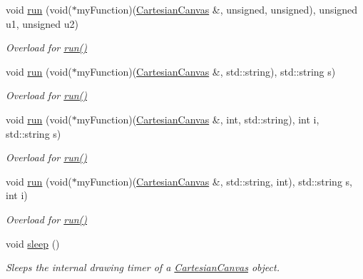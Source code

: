\begin{DoxyCompactItemize}
void \hyperlink{classtsgl_1_1_cartesian_canvas_a3351ccc624bb154dc910cafd9effe3cd}{run} (void($\ast$my\-Function)(\hyperlink{classtsgl_1_1_cartesian_canvas}{\-Cartesian\-Canvas} \&, unsigned, unsigned), unsigned u1, unsigned u2)
\begin{DoxyCompactList}\small\item\em \-Overload for \hyperlink{classtsgl_1_1_cartesian_canvas_a63a948af53582b713957b872a765dcdb}{run()} \end{DoxyCompactList}\item 
void \hyperlink{classtsgl_1_1_cartesian_canvas_a7d76ab9f68d8ce7f76b6be20305a5e95}{run} (void($\ast$my\-Function)(\hyperlink{classtsgl_1_1_cartesian_canvas}{\-Cartesian\-Canvas} \&, std\-::string), std\-::string s)
\begin{DoxyCompactList}\small\item\em \-Overload for \hyperlink{classtsgl_1_1_cartesian_canvas_a63a948af53582b713957b872a765dcdb}{run()} \end{DoxyCompactList}\item 
void \hyperlink{classtsgl_1_1_cartesian_canvas_ab0bce76883df5ae48e368a7b7835aefd}{run} (void($\ast$my\-Function)(\hyperlink{classtsgl_1_1_cartesian_canvas}{\-Cartesian\-Canvas} \&, int, std\-::string), int i, std\-::string s)
\begin{DoxyCompactList}\small\item\em \-Overload for \hyperlink{classtsgl_1_1_cartesian_canvas_a63a948af53582b713957b872a765dcdb}{run()} \end{DoxyCompactList}\item 
void \hyperlink{classtsgl_1_1_cartesian_canvas_abf52fc46a6fdca1410db6feb3c67a3cd}{run} (void($\ast$my\-Function)(\hyperlink{classtsgl_1_1_cartesian_canvas}{\-Cartesian\-Canvas} \&, std\-::string, int), std\-::string s, int i)
\begin{DoxyCompactList}\small\item\em \-Overload for \hyperlink{classtsgl_1_1_cartesian_canvas_a63a948af53582b713957b872a765dcdb}{run()} \end{DoxyCompactList}\item 
void \hyperlink{classtsgl_1_1_cartesian_canvas_a3ae99570b9a5f68f4ccf31593867edb0}{sleep} ()
\begin{DoxyCompactList}\small\item\em \-Sleeps the internal drawing timer of a \hyperlink{classtsgl_1_1_cartesian_canvas}{\-Cartesian\-Canvas} object. \end{DoxyCompactList}\item 

\end{DoxyCompactItemize}

